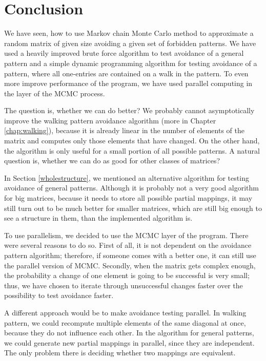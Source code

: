 \chapter*{Conclusion}
We have seen, how to use Markov chain Monte Carlo method to approximate a random matrix of given size avoiding a given set of forbidden patterns. We have used a heavily improved brute force algorithm to test avoidance of a general pattern and a simple dynamic programming algorithm for testing avoidance of a pattern, where all one-entries are contained on a walk in the pattern. To even more improve performance of the program, we have used parallel computing in the layer of the MCMC process.

The question is, whether we can do better? We probably cannot asymptotically improve the walking pattern avoidance algorithm (more in Chapter \ref{chap:walking}), because it is already linear in the number of elements of the matrix and computes only those elements that have changed. On the other hand, the algorithm is only useful for a small portion of all possible patterns. A natural question is, whether we can do as good for other classes of matrices?

In Section \ref{wholestructure}, we mentioned an alternative algorithm for testing avoidance of general patterns. Although it is probably not a very good algorithm for big matrices, because it needs to store all possible partial mappings, it may still turn out to be much better for smaller matrices, which are still big enough to see a structure in them, than the implemented algorithm is.

To use parallelism, we decided to use the MCMC layer of the program. There were several reasons to do so. First of all, it is not dependent on the avoidance pattern algorithm; therefore, if someone comes with a better one, it can still use the parallel version of MCMC. Secondly, when the matrix gets complex enough, the probability a change of one element is going to be successful is very small; thus, we have chosen to iterate through unsuccessful changes faster over the possibility to test avoidance faster.

A different approach would be to make avoidance testing parallel. In walking pattern, we could recompute multiple elements of the same diagonal at once, because they do not influence each other. In the algorithm for general patterns, we could generate new partial mappings in parallel, since they are independent. The only problem there is deciding whether two mappings are equivalent.
